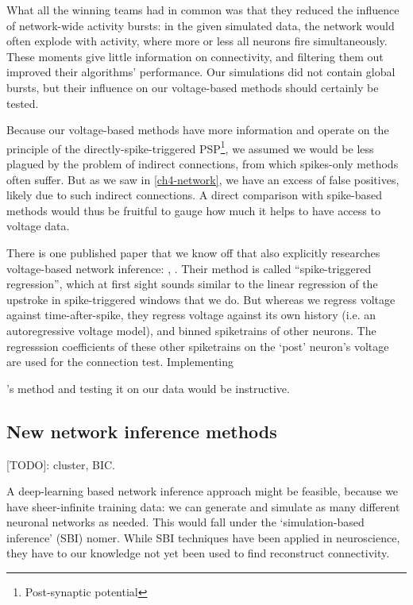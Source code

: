 What all the winning teams had in common was that they reduced the influence of network-wide activity bursts: in the given simulated data, the network would often explode with activity, where more or less all neurons fire simultaneously. These moments give little information on connectivity, and filtering them out improved their algorithms' performance.
Our simulations did not contain global bursts, but their influence on our voltage-based methods should certainly be tested.

Because our voltage-based methods have more information and operate on the principle of the directly-spike-triggered PSP\footnote{Post-synaptic potential}, we assumed we would be less plagued by the problem of indirect connections, from which spikes-only methods often suffer. But as we saw in \cref{ch4-network}, we have an excess of false positives, likely  due to such indirect connections. A direct comparison with spike-based methods would thus be fruitful to gauge how much it helps to have access to voltage data.

There is one published paper that we know off that also explicitly researches voltage-based network inference: , \cite{Zhang2017SpikeTriggeredRegressionSynaptic}.
Their method is called ``spike-triggered regression'', which at first sight sounds similar to the linear regression of the upstroke in spike-triggered windows that we do. But whereas we regress voltage against time-after-spike, they regress voltage against its own history (i.e. an autoregressive voltage model), and binned spiketrains of other neurons.
The regresssion coefficients of these other spiketrains on the `post' neuron's voltage are used for the connection test.
Implementing \author{Zhang2017SpikeTriggeredRegressionSynaptic}'s method and testing it on our data would be instructive.


\subsection{New network inference methods}

[TODO]: cluster, BIC.

A deep-learning based network inference approach might be feasible, because we have sheer-infinite training data: we can generate and simulate as many different neuronal networks as needed. This would fall under the `simulation-based inference' (SBI) nomer.\cite{Cranmer2020FrontierSimulationbasedInference} While SBI techniques have been applied in neuroscience\cite{Goncalves2020TrainingDeepNeural}, they have to our knowledge not yet been used to find reconstruct connectivity.


